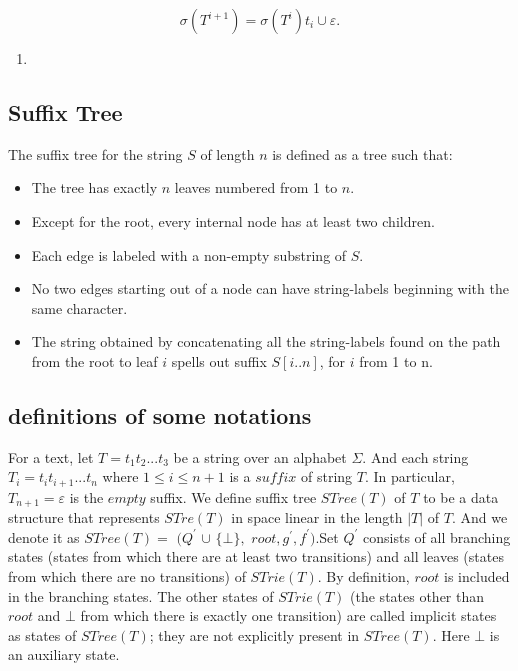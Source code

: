 \documentclass[paper=a4, fontsize=11pt]{scrartcl} %
\numberwithin{equation}{section} %
\numberwithin{figure}{section} %
\numberwithin{table}{section} %
\begin{document}
$$
\sigma(T^{i+1}) = \sigma(T^i)t_i \cup \varepsilon.
$$


\begin{enumerate}
  \item 
\end{enumerate}


\subsection{Suffix Tree}

The suffix tree for the string $S$ of length $n$ is defined as a tree such that:
\begin{itemize}
  \item The tree has exactly $n$ leaves numbered from 1 to $n$.
  \item Except for the root, every internal node has at least two children.
  \item Each edge is labeled with a non-empty substring of $S$.
  \item No two edges starting out of a node can have string-labels beginning with the same character.
  \item  The string obtained by concatenating all the string-labels found on the path from the root to leaf $i$ spells out suffix $S[i..n]$, for $i$ from 1 to n.
\end{itemize}

\subsection{definitions of some notations}
For a text, let $T = t_1t_2...t_3$ be a string over an alphabet $\Sigma$. And each string $T_i = t_it_{i+1}...t_n$ where $1 \leq i \leq n+1$ is a $suffix$ of string $T$. In particular, $T_{n+1} = \varepsilon$ is the $empty$ suffix. We define suffix tree $STree(T)$ of $T$ to be a data structure that represents $STre(T)$ in space linear in the length $|T|$ of $T$. And we denote it as $STree(T) =$
$(Q^{'}$ 
$\cup$
$\{\bot\},$
$root, g^{'}, f^{'})$.Set $Q^{'}$ consists of all branching states (states from which there
are at least two transitions) and all leaves (states from which there are no transitions) of $STrie(T)$. By definition, $root$ is included in the branching states.
The other states of $STrie(T)$ (the states other than $root$ and $\bot$ from which
there is exactly one transition) are called implicit states as states of $STree(T)$; they
are not explicitly present in $STree(T)$. Here $\bot$ is an auxiliary state.


\nocite{*}
\end{document}

